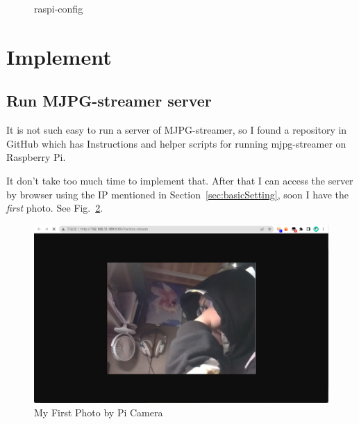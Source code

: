 \documentclass{article}
\begin{document}
\begin{figure}[!h]
	\centering
	\hspace{0 pt}
	\caption{raspi-config}
	\label{fig:PicamEN}
\end{figure}

\section{Implement}

\subsection{Run MJPG-streamer server}

It is not such easy to run a server of MJPG-streamer, so I found a repository in GitHub which has Instructions and helper scripts for running mjpg-streamer on Raspberry Pi\cite{gh:rpi-mjpg-streamer}.

It don't take too much time to implement that. After that I can access the server by browser using the IP mentioned in Section~\ref{sec:basicSetting}, soon I have the \emph{first} photo. See Fig.~\ref{fig:FirstPicOfPicam}.

\begin{figure}[!h]
	\centering
	\includegraphics[width=5 in]{../pic/FirstPicOfPicam.png}
	\caption{My First Photo by Pi Camera}
	\label{fig:FirstPicOfPicam}
\end{figure}
\end{document}
